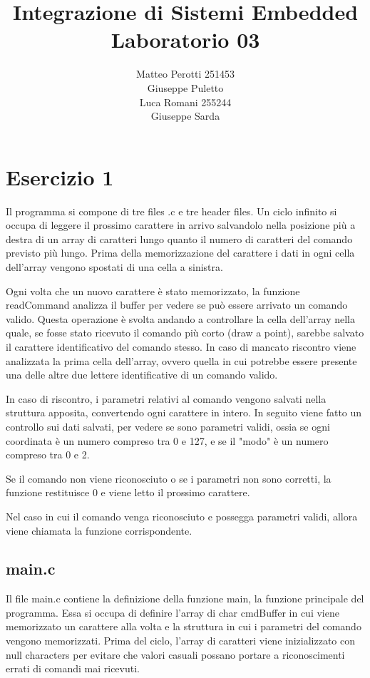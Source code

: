 \documentclass[a4paper]{article}
\title{Integrazione di Sistemi Embedded\\ Laboratorio 03}
\author{Matteo Perotti 251453\\ Giuseppe Puletto\\ Luca Romani 255244\\ Giuseppe Sarda}
\begin{document}
\maketitle

\newpage

\section{Esercizio 1}
Il programma si compone di tre files .c e tre header files.
Un ciclo infinito si occupa di leggere il prossimo carattere in arrivo salvandolo nella posizione più a destra
di un array di caratteri lungo quanto il numero di caratteri del comando previsto più lungo. Prima della
memorizzazione del carattere i dati in ogni cella dell'array vengono spostati di una cella a sinistra.

Ogni volta che un nuovo carattere è stato memorizzato, la funzione readCommand analizza il buffer per vedere
se può essere arrivato un comando valido. Questa operazione è svolta andando a controllare la cella dell'array
nella quale, se fosse stato ricevuto il comando più corto (draw a point), sarebbe salvato il carattere
identificativo del comando stesso. In caso di mancato riscontro viene analizzata la prima cella dell'array, ovvero
quella in cui potrebbe essere presente una delle altre due lettere identificative di un comando valido.

In caso di riscontro, i parametri relativi al comando vengono salvati nella struttura apposita, convertendo ogni 
carattere in intero. In seguito viene fatto un controllo sui dati salvati, per vedere se sono parametri validi,
ossia se ogni coordinata è un numero compreso tra 0 e 127, e se il "modo" è un numero compreso tra 0 e 2.

Se il comando non viene riconosciuto o se i parametri non sono corretti, la funzione restituisce 0 e viene letto il
prossimo carattere.

Nel caso in cui il comando venga riconosciuto e possegga parametri validi, allora viene chiamata la funzione 
corrispondente.
	\subsection{main.c}
		Il file main.c contiene la definizione della funzione main, la funzione principale del programma. 
		Essa si occupa di definire l'array di char cmdBuffer in cui viene memorizzato un carattere alla volta e
		la struttura in cui i parametri del comando vengono memorizzati.
		Prima del ciclo, l'array di caratteri viene inizializzato con null characters per evitare che valori
		casuali possano portare a riconoscimenti errati di comandi mai ricevuti.
\end{document}
